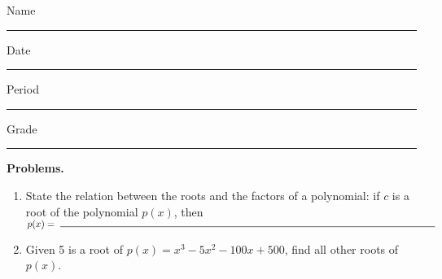 \documentclass[twoside, 10pt]{article}
\title{}
\date{}
\begin{document}
\noindent
{
Name \rule{16em}{.5pt} Date \rule{8em}{.5pt} Period \rule{4em}{.5pt} Grade  \rule{4em}{.5pt}
}
\vspace{1em}

{\noindent\bf Problems.}

\begin{enumerate}
    \item State the relation between the roots and the factors of a polynomial: if $c$ is a root of the polynomial \(p(x)\), then\\[1em] \(\displaystyle p(x) =\ \rule{40em}{0.5pt}\)
    \item Given 5 is a root of \(p(x) = x^3-5x^2 - 100x+500\), find all other roots of \(p(x)\).
\end{enumerate}
\end{document}
